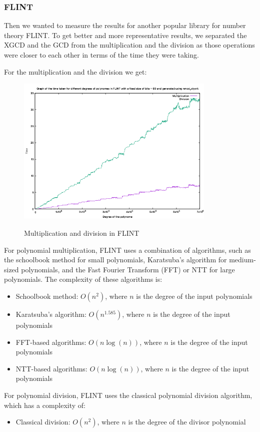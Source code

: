 \subsubsection{FLINT}

Then we wanted to measure the results for another popular library for number theory FLINT. 
To get better and more representative results, we separated the XGCD and the GCD from the multiplication and the division as those operations were closer to each other in terms of the time they were taking.

For the multiplication and the division we get:
\begin{figure}[H]
    \centering
    \includegraphics[width=0.85\textwidth]{figures/flint_mult_div.png}
    \label{fig2}
    \caption{Multiplication and division in FLINT}
\end{figure}
For polynomial multiplication, FLINT uses a combination of algorithms, such as the schoolbook method for small polynomials, Karatsuba's algorithm for medium-sized polynomials, and the Fast Fourier Transform (FFT) or NTT for large polynomials. The complexity of these algorithms is:
\begin{itemize}
    \item Schoolbook method: $O(n^2)$, where $n$ is the degree of the input polynomials
    \item Karatsuba's algorithm: $O(n^{1.585})$, where $n$ is the degree of the input polynomials
    \item FFT-based algorithms: $O(n \log(n))$, where $n$ is the degree of the input polynomials
    \item NTT-based algorithms: $O(n \log(n))$, where $n$ is the degree of the input polynomials
\end{itemize}
For polynomial division, FLINT uses the classical polynomial division algorithm, which has a complexity of:
\begin{itemize}
    \item Classical division: $O(n^2)$, where $n$ is the degree of the divisor polynomial
\end{itemize}

